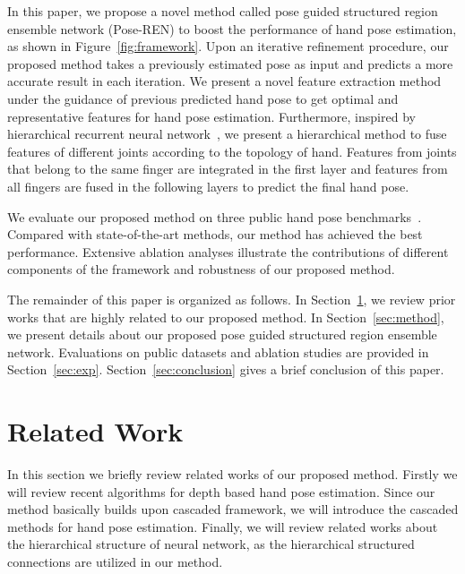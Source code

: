 \documentclass[final, 5p]{elsarticle}
\begin{document}
In this paper, we propose a novel method called pose guided structured region ensemble network (Pose-REN) to boost the performance of hand pose estimation, as shown in Figure~\ref{fig:framework}. Upon an iterative refinement procedure, our proposed method takes a previously estimated pose as input and predicts a more accurate result in each iteration. We present a novel feature extraction method under the guidance of previous predicted hand pose to get optimal and representative features for hand pose estimation.
Furthermore, inspired by hierarchical recurrent neural network~\cite{du2015hierarchical}, we present a hierarchical method to fuse features of different joints according to the topology of hand. Features from joints that belong to the same finger are integrated in the first layer and features from all fingers are fused in the following layers to predict the final hand pose.

We evaluate our proposed method on three public hand pose benchmarks~\cite{tang2014latent, tompson2014real, sun2015cascaded}. Compared with state-of-the-art methods, our method has achieved the best performance. Extensive ablation analyses illustrate the contributions of different components of the framework and robustness of our proposed method.


The remainder of this paper is organized as follows. In Section~\ref{sec:related-work}, we review prior works that are highly related to our proposed method. In Section~\ref{sec:method}, we present details about our proposed pose guided structured region ensemble network. Evaluations on public datasets and ablation studies are provided in Section~\ref{sec:exp}. Section~\ref{sec:conclusion} gives a brief conclusion of this paper.


\section{Related Work}
\label{sec:related-work}
In this section we briefly review related works of our proposed method. Firstly we will review recent algorithms for depth based hand pose estimation. Since our method basically builds upon cascaded framework, we will introduce the cascaded methods for hand pose estimation. Finally, we will review related works about the hierarchical structure of neural network, as the hierarchical structured connections are utilized in our method.
\end{document}
